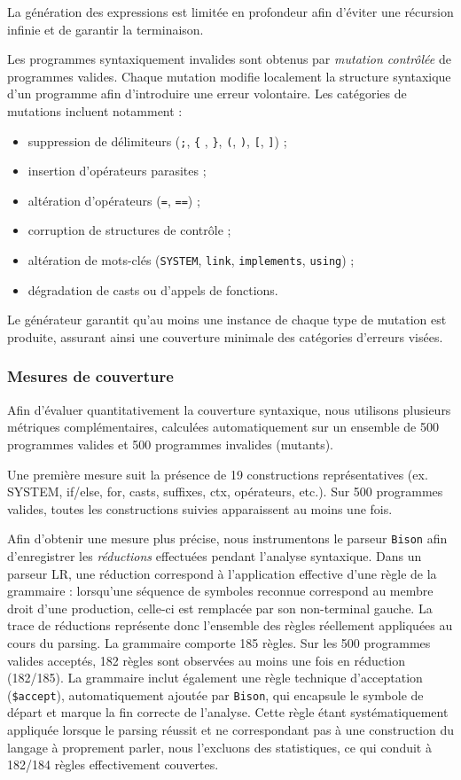 \documentclass[a4paper, 11pt]{article}
\DeclareRobustCommand{\prog}[1]{\begingroup\urlstyle{tt}\nolinkurl{#1}\endgroup}
\begin{document}
La génération des expressions est limitée en profondeur afin d’éviter une récursion infinie et de garantir la terminaison.

Les programmes syntaxiquement invalides sont obtenus par \emph{mutation contrôlée} de programmes valides. Chaque mutation modifie localement la structure syntaxique d’un programme afin d’introduire une erreur volontaire. Les catégories de mutations incluent notamment :

\begin{itemize}
    \item suppression de délimiteurs (\prog{;}, \prog{\{} , \prog{\}}, \prog{(}, \prog{)}, \prog{[}, \prog{]}) ;
    \item insertion d’opérateurs parasites ;
    \item altération d’opérateurs (\prog{=}, \prog{==}) ;
    \item corruption de structures de contrôle ;
    \item altération de mots-clés (\prog{SYSTEM}, \prog{link}, \prog{implements}, \prog{using}) ;
    \item dégradation de casts ou d’appels de fonctions.
\end{itemize}

Le générateur garantit qu’au moins une instance de chaque type de mutation est produite, assurant ainsi une couverture minimale des catégories d’erreurs visées.



\subsubsection{Mesures de couverture}
Afin d’évaluer quantitativement la couverture syntaxique, nous utilisons plusieurs métriques complémentaires, calculées automatiquement sur un ensemble de 500 programmes valides et 500 programmes invalides (mutants).

Une première mesure suit la présence de 19 constructions représentatives (ex. SYSTEM, if/else, for, casts, suffixes, ctx, opérateurs, etc.).
Sur 500 programmes valides, toutes les constructions suivies apparaissent au moins une fois.

Afin d’obtenir une mesure plus précise, nous instrumentons le parseur \prog{Bison} afin d’enregistrer les \emph{réductions} effectuées pendant l’analyse syntaxique. Dans un parseur LR, une réduction correspond à l’application effective d’une règle de la grammaire : lorsqu’une séquence de symboles reconnue correspond au membre droit d’une production, celle-ci est remplacée par son non-terminal gauche. La trace de réductions représente donc l’ensemble des règles réellement appliquées au cours du parsing. La grammaire comporte 185 règles. Sur les 500 programmes valides acceptés, 182 règles sont observées au moins une fois en réduction (182/185). La grammaire inclut également une règle technique d’acceptation (\prog{\$accept}), automatiquement ajoutée par \prog{Bison}, qui encapsule le symbole de départ et marque la fin correcte de l’analyse. Cette règle étant systématiquement appliquée lorsque le parsing réussit et ne correspondant pas à une construction du langage à proprement parler, nous l’excluons des statistiques, ce qui conduit à 182/184 règles effectivement couvertes.
\end{document}
